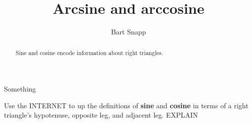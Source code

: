 \documentclass[noauthor,nooutcomes,12pt]{ximera}
\title{Arcsine and arccosine}
\author{Bart Snapp}
\begin{document}
\begin{abstract}
  Sine and cosine encode information about right triangles.
\end{abstract}
\maketitle

\begin{listOutcomes}
\item Something
\end{listOutcomes}
\mynewpage




\begin{question}
  Use the INTERNET to up the definitions of \textbf{sine} and
  \textbf{cosine} in terms of a right triangle's hypotenuse, opposite
  leg, and adjacent leg. EXPLAIN
  
  
\end{question}
\mynewpage
\end{document}
